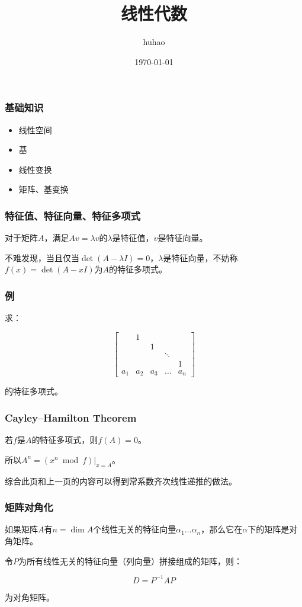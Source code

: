 \documentclass[10pt]{beamer}
\begin{document}
	\title{线性代数}
	\date{\today}
	\author{huhao}
	\maketitle
	\clearpage
	\begin{frame}
		\frametitle{基础知识}
	
		\begin{itemize}
			\item 线性空间
			\item 基
			\item 线性变换
			\item 矩阵、基变换
		\end{itemize}
	
	\end{frame}
	\begin{frame}
		\frametitle{特征值、特征向量、特征多项式}

		对于矩阵$A$，满足$Av=\lambda v$的$\lambda$是特征值，$v$是特征向量。

		不难发现，当且仅当$\det(A-\lambda I)=0$，$\lambda$是特征向量，不妨称$f(x)=\det(A-x I)$为$A$的特征多项式。
	\end{frame}
	\begin{frame}
		\frametitle{例}
	
		求：

		$$
		\begin{bmatrix}
		&1\\
		&&1\\
		&&&\ddots\\
		&&&&1\\
		a_1&a_2&a_3&\dots&a_n
		\end{bmatrix}
		$$

		的特征多项式。
	
	\end{frame}
	\begin{frame}
		\frametitle{Cayley–Hamilton Theorem}
	
		若$f$是$A$的特征多项式，则$f(A)=0$。

		所以$A^n=(x^n \bmod f)|_{x=A}$。

		综合此页和上一页的内容可以得到常系数齐次线性递推的做法。
	
	\end{frame}
	\begin{frame}
		\frametitle{矩阵对角化}
	
		如果矩阵$A$有$n=\dim A$个线性无关的特征向量$\alpha_1\dots\alpha_n$，那么它在$\alpha$下的矩阵是对角矩阵。

		令$P$为所有线性无关的特征向量（列向量）拼接组成的矩阵，则：

		$$
		D=P^{-1}AP
		$$

		为对角矩阵。
	
	\end{frame}
\end{document}
